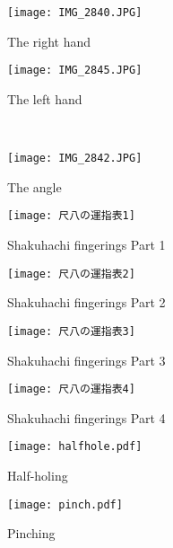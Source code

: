 \begin{figure}[H]
	\centering
	\begin{minipage}{0.4\textwidth}
	\centering
	\texttt{[image: IMG\_2840.JPG]}
	\caption{The right hand}
	\label{fig:right_hand_position}
	\end{minipage}
	\hfill
	\begin{minipage}{0.4\textwidth}
	\centering
	\vspace{1cm}
	\texttt{[image: IMG\_2845.JPG]}
	\caption{The left hand}
	\label{fig:left_hand_position}
	\end{minipage}
	\\
	\centering
	\begin{minipage}{0.4\textwidth}
	\centering
	\texttt{[image: IMG\_2842.JPG]}
	\caption{The angle}
	\label{fig:angle}
	\end{minipage}
	\hfill*

\end{figure}

\begin{figure}[H]
	\centering
	\texttt{[image: 尺八の運指表1]}
	\caption{Shakuhachi fingerings Part 1}
	\label{fig:shakuhachi_fingerings_1}
\end{figure}

\begin{figure}[H]
	\centering
	\texttt{[image: 尺八の運指表2]}
	\caption{Shakuhachi fingerings Part 2}
	\label{fig:shakuhachi_fingerings_2}
\end{figure}

\begin{figure}[H]
	\centering
	\texttt{[image: 尺八の運指表3]}
	\caption{Shakuhachi fingerings Part 3}
	\label{fig:shakuhachi_fingerings_3}
\end{figure}

\begin{figure}[H]
	\centering
	\texttt{[image: 尺八の運指表4]}
	\caption{Shakuhachi fingerings Part 4}
	\label{fig:shakuhachi_fingerings_4}
\end{figure}

\vfill

\begin{figure}
	\centering
	\begin{minipage}{0.9\textwidth}
	\centering
	\texttt{[image: halfhole.pdf]}
	\caption{Half-holing} \label{fig:half-holing}
	\texttt{[image: pinch.pdf]}
	\caption{Pinching} \label{fig:pinching}
	\end{minipage}
\end{figure}
